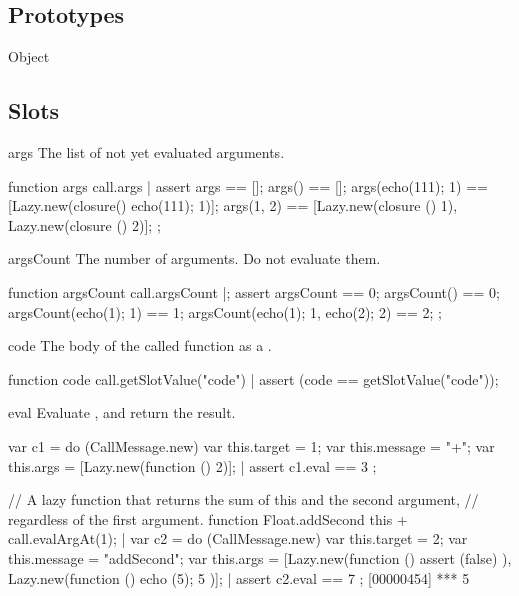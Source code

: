 \subsection{Prototypes}
\begin{refObjects}
\item[Object]
\end{refObjects}

\subsection{Slots}

\begin{urbiscriptapi}
\item[args]%
  The list of not yet evaluated arguments.
\begin{urbiscript}
function args { call.args }|
assert
{
  args == [];
  args() == [];
  args({echo(111); 1}) == [Lazy.new(closure() {echo(111); 1})];
  args(1, 2) == [Lazy.new(closure () {1}),
                 Lazy.new(closure () {2})];
};
\end{urbiscript}


\item[argsCount]
  The number of arguments.  Do not evaluate them.
\begin{urbiscript}
function argsCount { call.argsCount }|;
assert
{
  argsCount == 0;
  argsCount() == 0;
  argsCount({echo(1); 1}) == 1;
  argsCount({echo(1); 1}, {echo(2); 2}) == 2;
};
\end{urbiscript}

\item[code]
  The body of the called function as a .
\begin{urbiscript}
function code { call.getSlotValue("code") }|
assert (code == getSlotValue("code"));
\end{urbiscript}

\item[eval] Evaluate \this, and return the result.
\begin{urbiscript}
var c1 = do (CallMessage.new)
{
  var this.target = 1;
  var this.message = "+";
  var this.args = [Lazy.new(function () {2})];
}|
assert { c1.eval == 3 };

// A lazy function that returns the sum of this and the second argument,
// regardless of the first argument.
function Float.addSecond
{
  this + call.evalArgAt(1);
}|
var c2 = do (CallMessage.new)
{
  var this.target = 2;
  var this.message = "addSecond";
  var this.args = [Lazy.new(function (){ assert (false) }),
                   Lazy.new(function (){ echo (5); 5 })];
}|
assert { c2.eval == 7 };
[00000454] *** 5
\end{urbiscript}


\end{urbiscriptapi}
